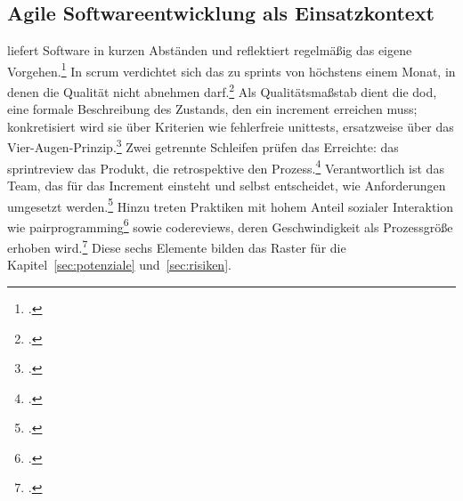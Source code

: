 \subsection{Agile Softwareentwicklung als Einsatzkontext}\label{subsec:agil}
 liefert Software in kurzen Abständen und reflektiert regelmäßig das eigene Vorgehen.\footcite[\vglf][o.\,S.]{Beck.2001} In \gls{scrum} verdichtet sich das zu \glspl{sprint} von höchstens einem Monat, in denen die Qualität nicht abnehmen darf.\footcite[\vglf][]{Schwaber.2020} Als Qualitätsmaßstab dient die \gls{dod}, eine formale Beschreibung des Zustands, den ein \gls{increment} erreichen muss; konkretisiert wird sie über Kriterien wie fehlerfreie \glspl{unittest}, ersatzweise über das Vier-Augen-Prinzip.\footcites(\vglf)()[][]{Schwaber.2020}[][]{Preussig.2020} Zwei getrennte Schleifen prüfen das Erreichte: das \gls{sprintreview} das Produkt, die \gls{retrospektive} den Prozess.\footcite[\vglf][ f.]{Schwaber.2020} Verantwortlich ist das Team, das für das Increment einsteht und selbst entscheidet, wie Anforderungen umgesetzt werden.\footcite[\vglf][, ]{Schwaber.2020} Hinzu treten Praktiken mit hohem Anteil sozialer Interaktion wie \gls{pairprogramming}\footcite[\vglf][]{Neumann.2026} sowie \glspl{codereview}, deren Geschwindigkeit als Prozessgröße erhoben wird.\footcite[\vglf][]{DORA.2024} Diese sechs Elemente bilden das Raster für die Kapitel~\ref{sec:potenziale} und~\ref{sec:risiken}.
